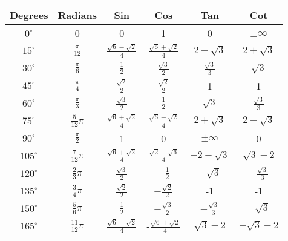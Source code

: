 \begin{tabular}{  | c | c || c | c | c | c | }
	\hline
	Degrees          & Radians              & Sin                               & Cos                                               & Tan                                    & Cot               \\
	\hline
    $0^{\circ}$      & 0                    & 0                                 &  1                                                & 0                                      & $\pm\infty$        \\
    \hline	
    $15^{\circ}$     & $\frac{\pi}{12}$     & $\frac{\sqrt{6}-\sqrt{2}}{4}$       &  $\frac{\sqrt{6}+\sqrt{2}}{4}$                      & $2-\sqrt{3}$                            & $2+\sqrt{3}$       \\
    \hline		
    $30^{\circ}$     & $\frac{\pi}{6}$     & $\frac{1}{2}$      &   $\frac{\sqrt{3}}{2} $     &  $\frac{\sqrt{3}}{3}$    &  $\sqrt{3}$  \\
    \hline		
    $45^{\circ}$     & $\frac{\pi}{4}$     & $\frac{\sqrt{2}}{2}$   &   $\frac{\sqrt{2}}{2}$    &  1    &  1  \\
    \hline		
    $60^{\circ}$     & $\frac{\pi}{3}$     & $\frac{\sqrt{3}}{2}$   &   $\frac{1}{2}$    &  $\sqrt{3}$    &  $\frac{\sqrt{3}}{3}$  \\
    \hline		
    $75^{\circ}$     & $\frac{5}{12}\pi$     & $\frac{\sqrt{6}+\sqrt{2}}{4}$   &   $\frac{\sqrt{6}-\sqrt{2}}{4}$    &  $2+\sqrt{3}$    &  $2-\sqrt{3}$  \\
    \hline
    $90^{\circ}$     & $\frac{\pi}{2}$     & 1   &   0    &  $\pm\infty$   &  0  \\
    \hline
   	$105^{\circ}$     & $\frac{7}{12}\pi$     & $\frac{\sqrt{6}+\sqrt{2}}{4}$   &   $\frac{\sqrt{2}-\sqrt{6}}{4}$    &  $-2-\sqrt{3}$    &  $\sqrt{3}-2$  \\
    \hline
    $120^{\circ}$     & $\frac{2}{3}\pi$     & $\frac{\sqrt{3}}{2}$      &   $-\frac{1}{2} $     &  $-\sqrt{3}$    &  $-\frac{\sqrt{3}}{3}$  \\
    \hline	
  	$135^{\circ}$     & $\frac{3}{4}\pi$     & $\frac{\sqrt{2}}{2}$   &   $-\frac{\sqrt{2}}{2}$    &  -1    &  -1  \\
  	\hline
  	$150^{\circ}$     & $\frac{5}{6}\pi$     & $\frac{1}{2}$      &   $-\frac{\sqrt{3}}{2}$     &  $-\frac{\sqrt{3}}{3}$    &  $-\sqrt{3}$  \\
  	\hline	
    $165^{\circ}$     & $\frac{11}{12}\pi$   & $\frac{\sqrt{6}-\sqrt{2}}{4}$       &  -$\frac{\sqrt{6}+\sqrt{2}}{4}$     & $\sqrt{3}-2$   & $-\sqrt{3}-2$       \\

\end{tabular}
